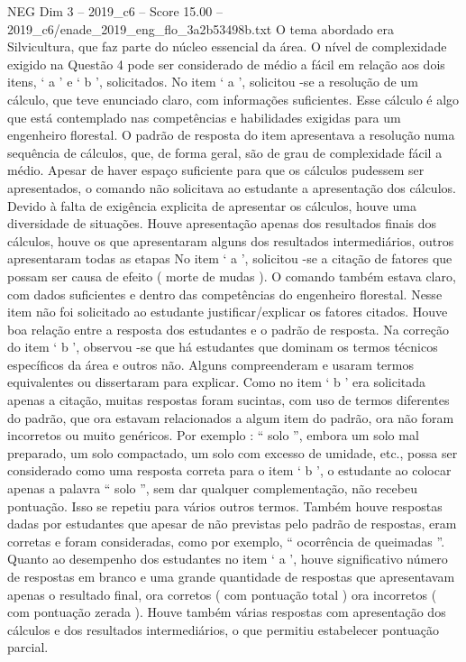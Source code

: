 \begin{textsample}{NEG Dim 3 – 2019\_c6 – Score 15.00 – 2019\_c6/enade\_2019\_eng\_flo\_3a2b53498b.txt}
O tema abordado era Silvicultura, que faz parte do núcleo essencial da área.
O nível de complexidade exigido na Questão 4 pode ser considerado de médio a fácil em relação aos dois itens, ‘ a ’ e ‘ b ’, solicitados.
No item ‘ a ’, solicitou -se a resolução de um cálculo, que teve enunciado claro, com informações suficientes.
Esse cálculo é algo que está contemplado nas competências e habilidades exigidas para um engenheiro florestal.
O padrão de resposta do item apresentava a resolução numa sequência de cálculos, que, de forma geral, são de grau de complexidade fácil a médio.
Apesar de haver espaço suficiente para que os cálculos pudessem ser apresentados, o comando não solicitava ao estudante a apresentação dos cálculos.
Devido à falta de exigência explicita de apresentar os cálculos, houve uma diversidade de situações.
Houve apresentação apenas dos resultados finais dos cálculos, houve os que apresentaram alguns dos resultados intermediários, outros apresentaram todas as etapas No item ‘ a ’, solicitou -se a citação de fatores que possam ser causa de efeito ( morte de mudas ).
O comando também estava claro, com dados suficientes e dentro das competências do engenheiro florestal.
Nesse item não foi solicitado ao estudante justificar/explicar os fatores citados.
Houve boa relação entre a resposta dos estudantes e o padrão de resposta.
Na correção do item ‘ b ’, observou -se que há estudantes que dominam os termos técnicos específicos da área e outros não.
Alguns compreenderam e usaram termos equivalentes ou dissertaram para explicar.
Como no item ‘ b ’ era solicitada apenas a citação, muitas respostas foram sucintas, com uso de termos diferentes do padrão, que ora estavam relacionados a algum item do padrão, ora não foram incorretos ou muito genéricos.
Por exemplo : “ solo ”, embora um solo mal preparado, um solo compactado, um solo com excesso de umidade, etc., possa ser considerado como uma resposta correta para o item ‘ b ’, o estudante ao colocar apenas a palavra “ solo ”, sem dar qualquer complementação, não recebeu pontuação.
Isso se repetiu para vários outros termos.
Também houve respostas dadas por estudantes que apesar de não previstas pelo padrão de respostas, eram corretas e foram consideradas, como por exemplo, “ ocorrência de queimadas ”.
Quanto ao desempenho dos estudantes no item ‘ a ’, houve significativo número de respostas em branco e uma grande quantidade de respostas que apresentavam apenas o resultado final, ora corretos ( com pontuação total ) ora incorretos ( com pontuação zerada ).
Houve também várias respostas com apresentação dos cálculos e dos resultados intermediários, o que permitiu estabelecer pontuação parcial.

\end{textsample}
